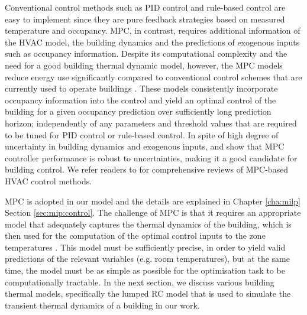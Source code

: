 Conventional control methods such as PID control and rule-based control are easy to implement since they are pure feedback strategies based on measured temperature and occupancy. MPC, in contrast, requires additional information of the HVAC model, the building dynamics and the predictions of exogenous inputs such as occupancy information. Despite its computational complexity and the need for a good building thermal dynamic model, however, the MPC models reduce energy use significantly compared to conventional control schemes that are currently used to operate buildings \citep{oldewurtel2010energy,mady2011stochastic,goyal2013energy,goyal2013occupancy,brooks2015energy}. These models consistently incorporate occupancy information into the control and yield an optimal control of the building for a given occupancy prediction over sufficiently long prediction horizon; independently of any parameters and threshold values that are required to be tuned for PID control or rule-based control. In spite of high degree of uncertainty in building dynamics and exogenous inputs, \cite{goyal2012effect} and \cite{zhang2013scenario} show that MPC controller performance is robust to uncertainties, making it a good candidate for building control. 
We refer readers to \citep{afram2014theory,mirakhorli2016occupancy} for comprehensive reviews of MPC-based HVAC control methods.

MPC is adopted in our model and the details are explained in Chapter \ref{cha:milp} Section \ref{sec:mip:control}. 
The challenge of MPC is that it requires an appropriate model that adequately captures the thermal dynamics of the building, which is then used for the computation of the optimal control inputs to the zone temperatures \citep{cigler2013beyond}. This model must be sufficiently precise, in order to yield valid predictions of the relevant variables (e.g. room temperatures), but at the same time, the model must be as simple as possible for the optimisation task to be computationally tractable. %
In the next section, we discuss various building thermal models, specifically the lumped RC model that is used to simulate the transient thermal dynamics of a building in our work.



